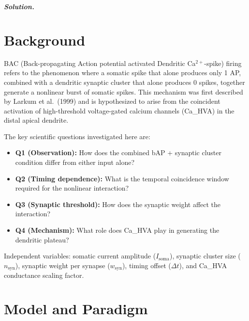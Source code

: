 \documentclass{article}
\newenvironment{solution}{%
    \par\noindent\begin{solutionbox}\textbf{\textit{Solution.}}\par\medskip\itshape
}{%
    \end{solutionbox}
}
\begin{document}
\begin{solution}

\section*{Background}

BAC (Back-propagating Action potential activated Dendritic Ca$^{2+}$-spike) firing refers to the phenomenon where a somatic spike that alone produces only 1 AP, combined with a dendritic synaptic cluster that alone produces 0 spikes, together generate a nonlinear burst of somatic spikes. This mechanism was first described by Larkum et al.\ (1999) and is hypothesized to arise from the coincident activation of high-threshold voltage-gated calcium channels (Ca\_HVA) in the distal apical dendrite.

The key scientific questions investigated here are:
\begin{itemize}
    \item \textbf{Q1 (Observation):} How does the combined bAP + synaptic cluster condition differ from either input alone?
    \item \textbf{Q2 (Timing dependence):} What is the temporal coincidence window required for the nonlinear interaction?
    \item \textbf{Q3 (Synaptic threshold):} How does the synaptic weight affect the interaction?
    \item \textbf{Q4 (Mechanism):} What role does Ca\_HVA play in generating the dendritic plateau?
\end{itemize}

Independent variables: somatic current amplitude ($I_{\mathrm{soma}}$), synaptic cluster size ($n_{\mathrm{syn}}$), synaptic weight per synapse ($w_{\mathrm{syn}}$), timing offset ($\Delta t$), and Ca\_HVA conductance scaling factor.

\section*{Model and Paradigm}


\end{solution}
\end{document}
